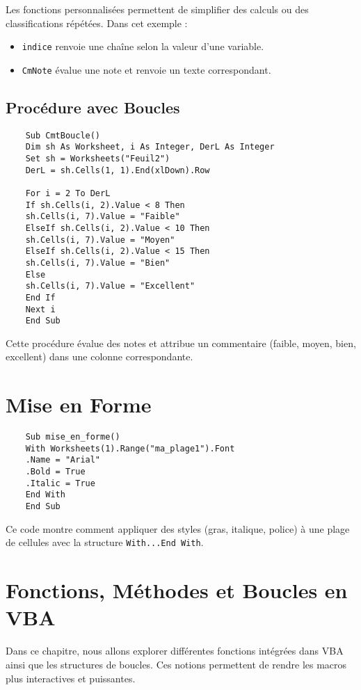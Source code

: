 \documentclass[a4paper,12pt]{report}
\begin{document}
Les fonctions personnalisées permettent de simplifier des calculs ou des classifications répétées. Dans cet exemple :
\begin{itemize}
	\item \texttt{indice} renvoie une chaîne selon la valeur d'une variable.
	\item \texttt{CmNote} évalue une note et renvoie un texte correspondant.
	
\end{itemize}
\newpage
\section{Procédure avec Boucles}
\begin{lstlisting}
	Sub CmtBoucle()
	Dim sh As Worksheet, i As Integer, DerL As Integer
	Set sh = Worksheets("Feuil2")
	DerL = sh.Cells(1, 1).End(xlDown).Row
	
	For i = 2 To DerL
	If sh.Cells(i, 2).Value < 8 Then
	sh.Cells(i, 7).Value = "Faible"
	ElseIf sh.Cells(i, 2).Value < 10 Then
	sh.Cells(i, 7).Value = "Moyen"
	ElseIf sh.Cells(i, 2).Value < 15 Then
	sh.Cells(i, 7).Value = "Bien"
	Else
	sh.Cells(i, 7).Value = "Excellent"
	End If
	Next i
	End Sub
\end{lstlisting}

Cette procédure évalue des notes et attribue un commentaire (faible, moyen, bien, excellent) dans une colonne correspondante.

\chapter{Mise en Forme}

\begin{lstlisting}
	Sub mise_en_forme()
	With Worksheets(1).Range("ma_plage1").Font
	.Name = "Arial"
	.Bold = True
	.Italic = True
	End With
	End Sub
\end{lstlisting}

Ce code montre comment appliquer des styles (gras, italique, police) à une plage de cellules avec la structure \texttt{With...End With}.

\chapter{Fonctions, Méthodes et Boucles en VBA}

Dans ce chapitre, nous allons explorer différentes fonctions intégrées dans VBA ainsi que les structures de boucles. Ces notions permettent de rendre les macros plus interactives et puissantes.
\end{document}
